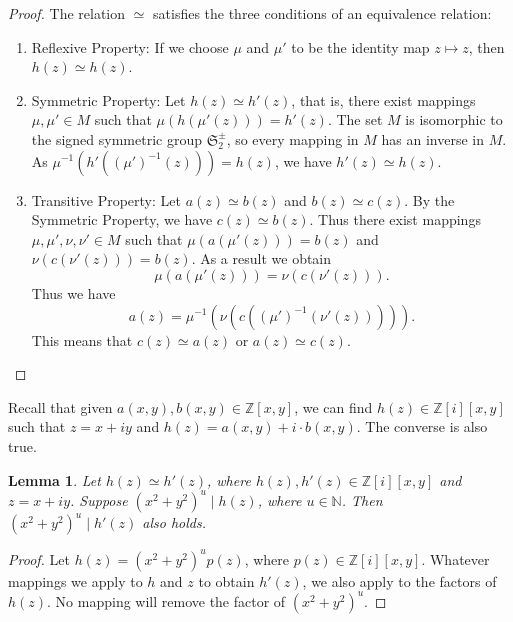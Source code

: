 \documentclass[12pt,table]{article}
\newtheorem{lemma}[theorem]{Lemma}
\newtheorem{corollary}[theorem]{Corollary}
\theoremstyle{definition}
\theoremstyle{remark}
\newcommand{\Nnn}{\mathbb N}
\newcommand{\Zzz}{\mathbb Z}
\newcommand{\vanish}[1]{}
\newcommand{\divides}{\mid}
\numberwithin{equation}{section}
\begin{document}
\begin{proof}
The relation $ \simeq $ satisfies the three conditions of an equivalence relation:
\begin{enumerate}
\item Reflexive Property: If we choose $ \mu $ and $ \mu'$ to be the identity map $ z \mapsto z $, 
then $ h(z) \simeq h(z) $.

\item Symmetric Property: Let  $ h(z) \simeq h'(z) $, that is, there exist mappings 
$ \mu, \mu' \in M $
such that $ \mu( h( \mu'( z ) ) )  = h'(z) $.
The set $M$ is isomorphic to the signed symmetric group $ \mathfrak{S}_2^\pm $,
so every mapping in $M$
has an inverse in $M$. As  $ \mu^{-1}( h'( (\mu')^{-1}( z ) ) )  = h(z) $,
we have $ h'(z) \simeq h(z) $.

\item Transitive Property: Let $ a(z) \simeq b(z) $ and $ b(z) \simeq c(z) $. By the 
Symmetric Property, we have $ c(z) \simeq b(z) $. Thus there exist mappings
$ \mu, \mu', \nu, \nu' \in M $ such that $ \mu( a( \mu'( z ) ) )  = b(z) $ and 
$ \nu( c( \nu'( z ) ) )  = b(z) $. As a result we obtain
\[
\mu( a( \mu'( z ) ) ) = \nu( c( \nu'( z ) ) ). 
\]
Thus we have
\[
a(  z  ) = \mu^{-1}( \nu( c( (\mu')^{-1}( \nu'( z ) ) ) ) ).
\]
This means that $ c(z) \simeq a(z) $ or $ a(z) \simeq c(z) $. \qedhere
\end{enumerate}
\end{proof}

Recall that given $ a(x,y), b(x,y) \in \Zzz[x,y] $,
we can find $ h(z) \in \Zzz [i][x,y] $
such that
$ z = x + iy $
and
$ h(z) = a(x,y) + i \cdot b(x,y) $. 
The converse is also true.



\begin{lemma}
Let $ h(z) \simeq h'(z) $, where $ h(z), h'(z) \in \Zzz[i][x,y] $
and $ z = x+ iy $.
Suppose $ ( x^2 + y^2 ) ^ u \divides h(z) $,
where $ u \in \Nnn $. Then $ ( x^2 + y^2 ) ^ u \divides h'(z) $ also holds.
\end{lemma}
   
\begin{proof}
Let $ h(z) = ( x^2 + y^2 ) ^ u  p(z) $, where $ p(z) \in \Zzz [i][x,y] $. 
Whatever mappings we apply to $h$ and $z$
to obtain $ h'(z) $, we also apply to the factors of $ h(z) $. 
No mapping will remove the factor of $ ( x^2 + y^2 ) ^ u $.
\end{proof}

\vanish{
\begin{corollary}
Let $ h(z), h'(z) \in \Zzz[i][x,y] $ with $ z = x+ iy $.
\[
h(z) \simeq h'(z) 
\implies 
( \forall u \in \Nnn \cup \{ 0 \},  ( x^2 + y^2 ) ^ u \divides h(z)  \iff ( x^2 + y^2 ) ^ u \divides h'(z)  )
\]
\end{corollary}
}
\end{document}
